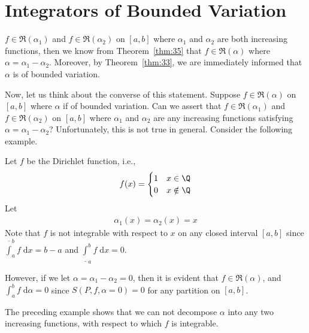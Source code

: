 \documentclass[thmcnt=section, 12pt]{elegantbook}
\begin{document}


\section{Integrators of Bounded Variation}


\par $f \in \mathfrak{R}(\alpha_1)$ and $f \in \mathfrak{R}(\alpha_2)$ on $[a, b]$ where $\alpha_1$ and $\alpha_2$ are both increasing functions, then we know from Theorem~\ref{thm:35} that $f \in \mathfrak{R}(\alpha)$ where $\alpha = \alpha_1 - \alpha_2$. Moreover, by Theorem~\ref{thm:33}, we are immediately informed that $\alpha$ is of bounded variation. 

\par Now, let us think about the converse of this statement. Suppose $f \in \mathfrak{R}(\alpha)$ on $[a, b]$ where $\alpha$ if of bounded variation. Can we assert that $f \in \mathfrak{R}(\alpha_1)$ and $f \in \mathfrak{R}(\alpha_2)$ on $[a, b]$ where $\alpha_1$ and $\alpha_2$ are any increasing functions satisfying $\alpha = \alpha_1 - \alpha_2$? Unfortunately, this is not true in general. Consider the following example.

\begin{example}
    Let $f$ be the Dirichlet function, i.e., 
    \begin{align*}
        f(x) = \begin{cases}
            1 &x \in \Q \\ 
            0 & x \notin \Q
        \end{cases}
    \end{align*}
    Let
    \begin{align*}
        \alpha_1(x) = \alpha_2(x) = x
    \end{align*}
    Note that $f$ is not integrable with respect to $x$ on any closed interval $[a, b]$ since $\overline{\int}_a^b f \; \mathrm{d}x = b-a$ and $\underline{\int}_a^b f \; \mathrm{d}x = 0$.

    \par However, if we let $\alpha = \alpha_1 - \alpha_2 = 0$, then it is evident that $f \in \mathfrak{R}(\alpha)$, and $\int_a^b f \; \mathrm{d}\alpha = 0$ since $S(P, f, \alpha = 0) = 0$ for any partition on $[a, b]$.
\end{example}

\par The preceding example shows that we can not decompose $\alpha$ into any two increasing functions, with respect to which $f$ is integrable.
\end{document}
